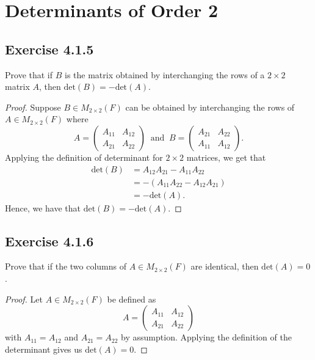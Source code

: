 \section{Determinants of Order 2}

\subsection*{Exercise 4.1.5} Prove that if \( B   \) is the matrix obtained by interchanging the rows of a \( 2 \times 2  \) matrix \( A  \), then \( \text{det}(B) = - \text{det}(A) \).
\begin{proof}
Suppose \( B \in {M}_{2 \times 2}(F)  \) can be obtained by interchanging the rows of \( A \in {M}_{2 \times 2}(F)  \) where  
\[  A = \begin{pmatrix}
    {A}_{11} & {A}_{12} \\
    {A}_{21} & {A}_{22}
\end{pmatrix} \ \text{ and } \ B = \begin{pmatrix}
    {A}_{21} & {A}_{22} \\
    {A}_{11} & {A}_{12}
\end{pmatrix}. \]
Applying the definition of determinant for \( 2 \times 2  \) matrices, we get that
\begin{align*}
    \text{det}(B) &= {A}_{12} {A}_{21} - {A}_{11} {A}_{22} \\
                  &= - ({A}_{11}{A}_{22} - {A}_{12} {A}_{21}) \\
                  &= - \text{det}(A).
\end{align*}
Hence, we have that \( \text{det}(B) = - \text{det}(A) \).
\end{proof}

\subsection*{Exercise 4.1.6} Prove that if the two columns of \( A \in {M}_{2 \times 2}(F)  \) are identical, then \( \text{det}(A) = 0  \).
\begin{proof}
Let \( A \in {M}_{2 \times 2}(F)  \) be defined as
\[  A = \begin{pmatrix}
    {A}_{11} & {A}_{12} \\
    {A}_{21} & {A}_{22}
\end{pmatrix} \] 
with \( {A}_{11} = {A}_{12}  \) and \( {A}_{21} = {A}_{22} \) by assumption. Applying the definition of the determinant gives us \( \text{det}(A) = 0  \).
\end{proof}

